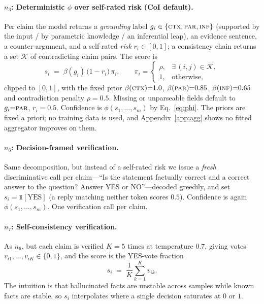 \documentclass[11pt]{article}
\begin{document}
\paragraph{$n_3$: Deterministic $\phi$ over self-rated risk (CoI default).} Per claim the
model returns a \emph{grounding} label $g_i\in\{\textsc{ctx},\textsc{par},\textsc{inf}\}$
(supported by the input / by parametric knowledge / an inferential leap), an evidence
sentence, a counter-argument, and a self-rated \emph{risk} $r_i\in[0,1]$; a consistency chain
returns a set $\mathcal{K}$ of contradicting claim pairs. The score is
\begin{equation}
s_i \;=\; \beta(g_i)\,\bigl(1-r_i\bigr)\,\pi_i,
\qquad
\pi_i=\begin{cases}\rho, & \exists\,(i,j)\in\mathcal{K},\\ 1,&\text{otherwise,}\end{cases}
\label{eq:sclaim}
\end{equation}
clipped to $[0,1]$, with the fixed prior $\beta(\textsc{ctx}){=}1.0$,
$\beta(\textsc{par}){=}0.85$, $\beta(\textsc{inf}){=}0.65$ and contradiction penalty
$\rho{=}0.5$. Missing or unparseable fields default to $g_i{=}\textsc{par}$, $r_i{=}0.5$.
Confidence is $\phi(s_1,\dots,s_m)$ by Eq.~\ref{eq:phi}. The priors are fixed a priori; no
training data is used, and Appendix~\ref{app:agg} shows no fitted aggregator improves on them.

\paragraph{$n_6$: Decision-framed verification.} Same decomposition, but instead of a
self-rated risk we issue a \emph{fresh} discriminative call per claim---``Is the statement
factually correct and a correct answer to the question? Answer YES or NO''---decoded greedily,
and set $s_i=\mathbb{1}[\text{YES}]$ (a reply matching neither token scores $0.5$). Confidence
is again $\phi(s_1,\dots,s_m)$. One verification call per claim.

\paragraph{$n_7$: Self-consistency verification.} As $n_6$, but each claim is verified $K{=}5$
times at temperature $0.7$, giving votes $v_{i1},\dots,v_{iK}\in\{0,1\}$, and the score is the
YES-vote fraction
\begin{equation}
s_i \;=\; \frac{1}{K}\sum_{k=1}^{K} v_{ik}.
\label{eq:vote}
\end{equation}
The intuition is that hallucinated facts are unstable across samples while known facts are
stable, so $s_i$ interpolates where a single decision saturates at $0$ or $1$.
\end{document}
